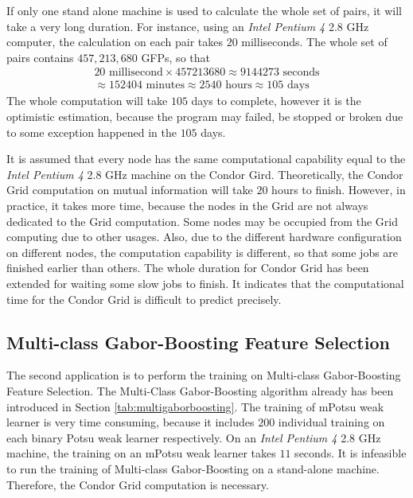 If only one stand alone machine is used to calculate the whole set of pairs, it will take a very long duration. For instance, using an \textit{Intel Pentium 4} 2.8 GHz computer, the calculation on each pair takes $20$ milliseconds. The whole set of pairs contains $457,213,680$ GFPs, so that 
\begin{eqnarray}
20\textrm{ millisecond} \times 457213680 \approx 9144273 \textrm{ seconds} \nonumber\\ 
\approx 152404\textrm{ minutes} \approx 2540\textrm{ hours} \approx 105\textrm{ days} \nonumber
\end{eqnarray}
The whole computation will take $105$ days to complete, however it is the optimistic estimation, because the program may failed, be stopped or broken due to some exception happened in the $105$ days.

It is assumed that every node has the same computational capability equal to the \textit{Intel Pentium 4} 2.8 GHz machine on the Condor Gird. Theoretically, the Condor Grid computation on mutual information will take $20$ hours to finish. However, in practice, it takes more time, because the nodes in the Grid are not always dedicated to the Grid computation. Some nodes may be occupied from the Grid computing due to other usages. Also, due to the different hardware configuration on different nodes, the computation capability is different, so that some jobs are finished earlier than others. The whole duration for Condor Grid has been extended for waiting some slow jobs to finish. It indicates that the computational time for the Condor Grid is difficult to predict precisely.

\subsection{Multi-class Gabor-Boosting Feature Selection}
The second application is to perform the training on Multi-class Gabor-Boosting Feature Selection. The Multi-Class Gabor-Boosting algorithm already has been introduced in \mbox{Section} \ref{tab:multigaborboosting}. The training of mPotsu weak learner is very time consuming, because it includes $200$ individual training on each binary Potsu weak learner respectively. On an \textit{Intel Pentium 4} 2.8 GHz machine, the training on an mPotsu weak learner takes $11$ seconds. It is infeasible to run the training of Multi-class Gabor-Boosting on a stand-alone machine. Therefore, the Condor Grid computation is necessary.

